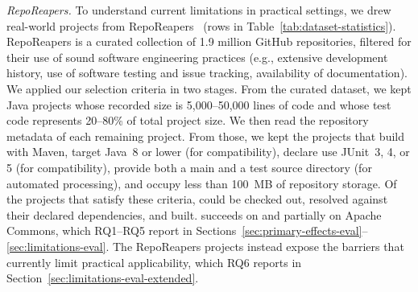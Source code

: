 \textit{RepoReapers.}
To understand current limitations in practical settings,
we drew real-world projects from RepoReapers~\cite{munaiah_2017_reporeapers}
(rows \DatasetRepoReapers{} in Table~\ref{tab:dataset-statistics}).
RepoReapers is a curated collection of 1.9 million GitHub repositories,
filtered for their use of sound software engineering practices
(e.g., extensive development history,
use of software testing and issue tracking,
availability of documentation).
We applied our selection criteria in two stages.
From the curated dataset, we kept Java projects
whose recorded size is 5,000--50,000 lines of code
and whose test code represents 20--80\% of total project size.
We then read the repository metadata of each remaining project.
From those, we kept the projects that build with Maven,
target Java~8 or lower (for \ToolSPF{} compatibility),
declare use JUnit~3, 4, or 5 (for \ToolTeralizer{} compatibility),
provide both a main and a test source directory (for automated processing),
and occupy less than 100~MB of repository storage.
Of the projects that satisfy these criteria,
\TzRealworldEligibleProjects{} could be checked out,
resolved against their declared dependencies, and built.
\ToolTeralizer{} succeeds on \DatasetEqBench{} and partially on Apache Commons,
which RQ1--RQ5 report in Sections~\ref{sec:primary-effects-eval}--\ref{sec:limitations-eval}.
The RepoReapers projects instead expose the barriers that currently limit
practical applicability, which RQ6 reports in Section~\ref{sec:limitations-eval-extended}.
